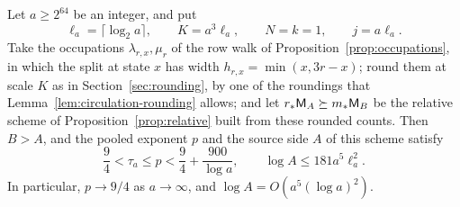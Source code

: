 \begin{theorem}\label{thm:quantitative}
Let \(a\ge2^{64}\) be an integer, and put
\[
 \ell_a=\lceil\log_2a\rceil,\qquad K=a^3\ell_a,\qquad N=k=1,
 \qquad j=a\ell_a.
\]
Take the occupations \(\lambda_{r,x},\mu_r\) of the row walk of
Proposition~\ref{prop:occupations}, in which the split at state \(x\)
has width \(h_{r,x}=\min(x,3r-x)\); round them at scale \(K\) as in
Section~\ref{sec:rounding}, by one of the roundings that
Lemma~\ref{lem:circulation-rounding} allows; and let
\(r_*\mathsf M_A\succeq m_*\mathsf M_B\) be the relative scheme of
Proposition~\ref{prop:relative} built from these rounded counts. Then
\(B>A\), and the pooled exponent \(p\) and the source side \(A\) of this
scheme satisfy
\begin{equation}\label{eq:explicit-rate}
 \frac94<\tau_a\le p<\frac94+\frac{900}{\log a},
 \qquad
 \log A\le181a^5\ell_a^2.
\end{equation}
In particular, \(p\to9/4\) as \(a\to\infty\), and
\(\log A=O(a^5(\log a)^2)\).
\end{theorem}

